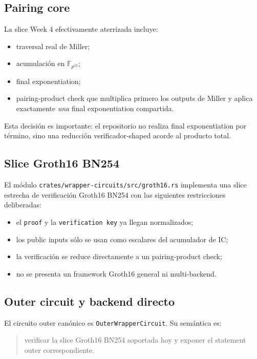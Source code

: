 \documentclass[11pt,a4paper]{article}
\begin{document}
\subsection{Pairing core}

La slice Week 4 efectivamente aterrizada incluye:

\begin{itemize}
  \item traversal real de Miller;
  \item acumulaci\'on en \(\mathbb{F}_{p^{12}}\);
  \item final exponentiation;
  \item pairing-product check que multiplica primero los outputs de Miller y aplica
  exactamente \emph{una} final exponentiation compartida.
\end{itemize}

Esta decisi\'on es importante: el repositorio no realiza final exponentiation por t\'ermino, sino una
reducci\'on verificador-shaped acorde al producto total.

\subsection{Slice Groth16 BN254}

El m\'odulo \texttt{crates/wrapper-circuits/src/groth16.rs} implementa una slice estrecha de
verificaci\'on Groth16 BN254 con las siguientes restricciones deliberadas:

\begin{itemize}
  \item el \texttt{proof} y la \texttt{verification key} ya llegan normalizados;
  \item los public inputs s\'olo se usan como escalares del acumulador de IC;
  \item la verificaci\'on se reduce directamente a un pairing-product check;
  \item no se presenta un framework Groth16 general ni multi-backend.
\end{itemize}

\subsection{Outer circuit y backend directo}

El circuito outer can\'onico es \texttt{OuterWrapperCircuit}. Su sem\'antica es:

\begin{quote}
verificar la slice Groth16 BN254 soportada hoy y exponer el statement outer correspondiente.
\end{quote}
\end{document}
